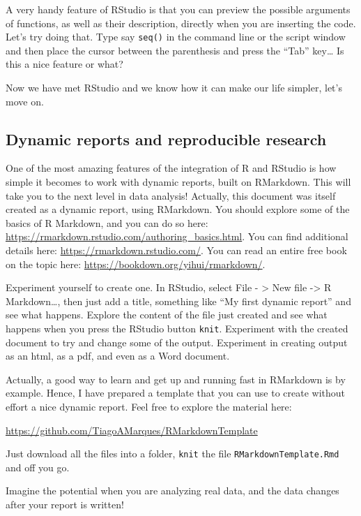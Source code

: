 \documentclass[
]{article}
\begin{document}
A very handy feature of RStudio is that you can preview the possible
arguments of functions, as well as their description, directly when you
are inserting the code. Let's try doing that. Type say \texttt{seq()} in
the command line or the script window and then place the cursor between
the parenthesis and press the ``Tab'' key\ldots{} Is this a nice feature
or what?

Now we have met RStudio and we know how it can make our life simpler,
let's move on.

\subsection{Dynamic reports and reproducible
research}\label{dynamic-reports-and-reproducible-research}

One of the most amazing features of the integration of R and RStudio is
how simple it becomes to work with dynamic reports, built on RMarkdown.
This will take you to the next level in data analysis! Actually, this
document was itself created as a dynamic report, using RMarkdown. You
should explore some of the basics of R Markdown, and you can do so here:
\url{https://rmarkdown.rstudio.com/authoring_basics.html}. You can find
additional details here: \url{https://rmarkdown.rstudio.com/}. You can
read an entire free book on the topic here:
\url{https://bookdown.org/yihui/rmarkdown/}.

Experiment yourself to create one. In RStudio, select File -
\textgreater{} New file -\textgreater{} R Markdown\ldots, then just add
a title, something like ``My first dynamic report'' and see what
happens. Explore the content of the file just created and see what
happens when you press the RStudio button \texttt{knit}. Experiment with
the created document to try and change some of the output. Experiment in
creating output as an html, as a pdf, and even as a Word document.

Actually, a good way to learn and get up and running fast in RMarkdown
is by example. Hence, I have prepared a template that you can use to
create without effort a nice dynamic report. Feel free to explore the
material here:

\url{https://github.com/TiagoAMarques/RMarkdownTemplate}

Just download all the files into a folder, \texttt{knit} the file
\texttt{RMarkdownTemplate.Rmd} and off you go.

Imagine the potential when you are analyzing real data, and the data
changes after your report is written!
\end{document}
